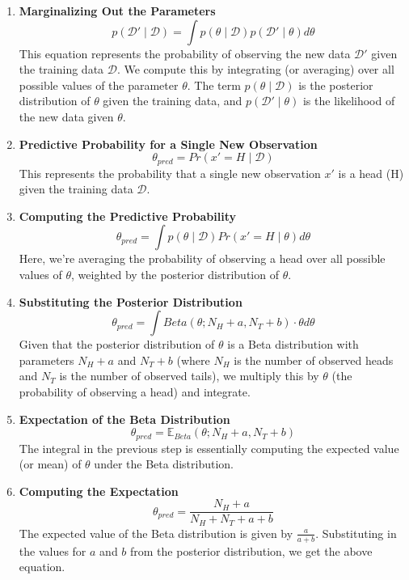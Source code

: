 \documentclass{article}
\begin{document}
\begin{enumerate}
    \item \textbf{Marginalizing Out the Parameters}\\
    \[ p(\mathcal{D'} \mid \mathcal{D}) = \int p(\theta \mid \mathcal{D})p(\mathcal{D'} \mid \theta ) d\theta \]
This equation represents the probability of observing the new data \( \mathcal{D'} \) given the training data \( \mathcal{D} \). We compute this by integrating (or averaging) over all possible values of the parameter \( \theta \). The term \( p(\theta \mid \mathcal{D}) \) is the posterior distribution of \( \theta \) given the training data, and \( p(\mathcal{D'} \mid \theta ) \) is the likelihood of the new data given \( \theta \).
    \item \textbf{Predictive Probability for a Single New Observation}\\
    \[ \theta_{pred} = Pr(x'=H \mid \mathcal{D}) \]
This represents the probability that a single new observation \( x' \) is a head (H) given the training data \( \mathcal{D} \).
    \item \textbf{Computing the Predictive Probability}\\
    \[ \theta_{pred} = \int p(\theta \mid \mathcal{D})Pr(x'=H \mid \theta)d\theta \]
Here, we're averaging the probability of observing a head over all possible values of \( \theta \), weighted by the posterior distribution of \( \theta \).
    \item \textbf{Substituting the Posterior Distribution}\\
    \[ \theta_{pred} = \int Beta(\theta; N_H+a, N_T+b) \cdot \theta d\theta \]
Given that the posterior distribution of \( \theta \) is a Beta distribution with parameters \( N_H+a \) and \( N_T+b \) (where \( N_H \) is the number of observed heads and \( N_T \) is the number of observed tails), we multiply this by \( \theta \) (the probability of observing a head) and integrate.
    \item \textbf{Expectation of the Beta Distribution}\\
    \[ \theta_{pred} = \mathbb{E}_{Beta}(\theta; N_H+a, N_T+b) \]
The integral in the previous step is essentially computing the expected value (or mean) of \( \theta \) under the Beta distribution.
    \item \textbf{Computing the Expectation}\\
    \[ \theta_{pred} = \frac{N_H+a}{N_H+N_T+a+b} \]
The expected value of the Beta distribution is given by \( \frac{a}{a+b} \). Substituting in the values for \( a \) and \( b \) from the posterior distribution, we get the above equation.
\end{enumerate}
\end{document}
